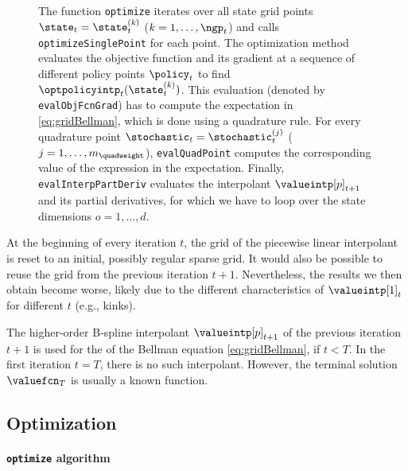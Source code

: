 \begin{figure}
{    The function \texttt{optimize} iterates over all state grid points
    $\state_t = \state_t^{(k)}$ ($k = 1, \dotsc, \ngp_t$)
    and calls \texttt{optimizeSinglePoint} for each point.
    The optimization method evaluates the objective function and
    its gradient at a sequence of different policy points $\policy_t$
    to find $\optpolicyintp_t(\state_t^{(k)})$.
    This evaluation (denoted by \texttt{evalObjFcnGrad})
    has to compute the expectation in \cref{eq:gridBellman},
    which is done using a quadrature rule.
    For every quadrature point $\stochastic_t = \stochastic_t^{(j)}$
    ($j = 1, \dotsc, m_{\quadweight}$),
    \texttt{evalQuadPoint} computes the corresponding value of
    the expression in the expectation.
    Finally, \texttt{evalInterpPartDeriv} evaluates the interpolant
    $\valueintp[p]_{t+1}$ and its partial derivatives,
    for which we have to loop over the state dimensions $o = 1, \dotsc, d$.%
  }%
  \label{fig:structureSolveValueFunction}%
\end{figure}

At the beginning of every iteration $t$,
the grid of the piecewise linear interpolant is reset
to an initial, possibly regular sparse grid.
It would also be possible to reuse the grid from the
previous iteration $t + 1$.
Nevertheless, the results we then obtain become worse,
likely due to the different characteristics of $\valueintp[1]_t$
for different $t$ (e.g., kinks).

The higher-order B-spline interpolant
$\valueintp[p]_{t+1}$ of the previous iteration $t+1$ is used
for the \rhs of the Bellman equation \eqref{eq:gridBellman},
if $t < T$.
In the first iteration $t = T$,
there is no such interpolant.
However,
the terminal solution $\valuefcn_T$ is usually a known function.



\subsection{Optimization}
\label{sec:823optimization}

\paragraph{\texttt{optimize} algorithm}

